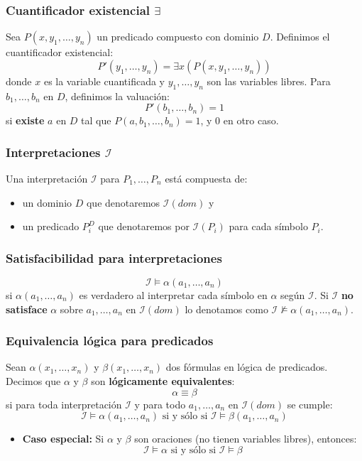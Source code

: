 \begin{multicols}{2}
    \subsubsection*{Cuantificador existencial $\exists$}
    Sea $P(x, y_1, \ldots, y_n)$ un predicado compuesto con dominio $D$. Definimos el cuantificador existencial:
        $$
        P'(y_1, \ldots, y_n) = \exists x(P(x, y_1, \ldots, y_n))
        $$
        donde $x$ es la variable cuantificada y $y_1, \ldots, y_n$ son las variables libres. Para $b_1, \ldots, b_n$ en $D$, definimos la valuación:
        $$
        P'(b_1, \ldots, b_n) = 1
        $$
        si \textbf{existe} $a$ en $D$ tal que $P(a, b_1, \ldots, b_n) = 1$, y 0 en otro caso.
    
    \subsubsection*{Interpretaciones $\mathcal{I}$}
    Una interpretación $\mathcal{I}$ para $P_1, \ldots, P_n$ está compuesta de:
        \begin{itemize}
            \item un dominio $D$ que denotaremos $\mathcal{I}(dom)$ y
            \item un predicado $P_i^D$ que denotaremos por $\mathcal{I}(P_i)$ para cada símbolo $P_i$.
        \end{itemize}
    
    \subsubsection*{Satisfacibilidad para interpretaciones}
        $$
        \mathcal{I} \models \alpha(a_1,\ldots,a_n)
        $$
        si $\alpha(a_1,\ldots,a_n)$ es verdadero al interpretar cada símbolo en $\alpha$ según $\mathcal{I}$. Si $\mathcal{I}$ \textbf{no satisface} $\alpha$ sobre $a_1,\ldots,a_n$ en $\mathcal{I}(dom)$ lo denotamos como $\mathcal{I} \nvDash \alpha(a_1,\ldots,a_n)$.
    
    \subsubsection*{Equivalencia lógica para predicados}
    Sean $\alpha(x_1, \ldots, x_n)$ y $\beta(x_1,\ldots,x_n)$ dos fórmulas en lógica de predicados. Decimos que $\alpha$ y $\beta$ son \textbf{lógicamente equivalentes}:
    $$
    \alpha \equiv \beta
    $$
    si para toda interpretación $\mathcal{I}$ y para todo $a_1,\ldots,a_n$ en $\mathcal{I}(dom)$ se cumple:
    $$
    \mathcal{I} \models \alpha(a_1,\ldots,a_n) \text{ si y sólo si } \mathcal{I} \models \beta(a_1,\ldots,a_n)
    $$
    \begin{itemize}
        \item \textbf{Caso especial:} Si $\alpha$ y $\beta$ son oraciones (no tienen variables libres), entonces:
        $$
        \mathcal{I} \models \alpha \text{ si y sólo si } \mathcal{I} \models \beta
        $$
    \end{itemize}
    

\end{multicols}
